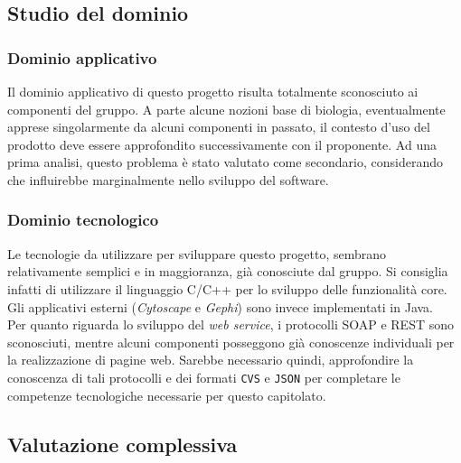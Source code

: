 \subsection{Studio del dominio}
\label{dominiocap2}
\subsubsection{Dominio applicativo}
\label{dominioapp2}
Il dominio applicativo di questo progetto risulta totalmente sconosciuto ai componenti del gruppo. A parte alcune nozioni base di biologia, eventualmente apprese singolarmente da alcuni componenti in passato, il contesto d'uso del prodotto deve essere approfondito successivamente con il proponente. Ad una prima analisi, questo problema è stato valutato come secondario, considerando che influirebbe marginalmente nello sviluppo del software.

\subsubsection{Dominio tecnologico}
\label{dominiotec2}
Le tecnologie da utilizzare per sviluppare questo progetto, sembrano relativamente semplici e in maggioranza, già conosciute dal gruppo. Si consiglia infatti di utilizzare il linguaggio C/C++\glossario{} per lo sviluppo delle funzionalità core. Gli applicativi esterni (\textit{Cytoscape} e \textit{Gephi}) sono invece implementati in Java. 
\\ Per quanto riguarda lo sviluppo del \textit{web service}, i protocolli SOAP e REST sono sconosciuti, mentre alcuni componenti posseggono già conoscenze individuali per la realizzazione di pagine web. Sarebbe necessario quindi, approfondire la conoscenza di tali protocolli e dei formati \verb!CVS! e \verb!JSON! per completare le competenze tecnologiche necessarie per questo capitolato.

\subsection{Valutazione complessiva}
\label{valutazione2}
